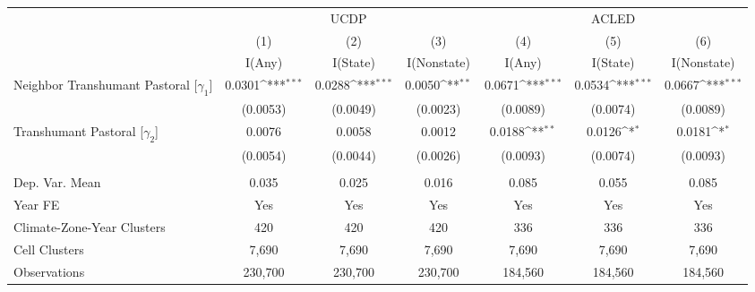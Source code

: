 {
\def\sym#1{\ifmmode^{#1}\else\(^{#1}\)\fi}
\begin{tabular}{l*{6}{c}}
\toprule
                    &\multicolumn{3}{c}{UCDP}                                         &\multicolumn{3}{c}{ACLED}                                        \\\cmidrule(lr){2-4}\cmidrule(lr){5-7}
                    &\multicolumn{1}{c}{(1)}&\multicolumn{1}{c}{(2)}&\multicolumn{1}{c}{(3)}&\multicolumn{1}{c}{(4)}&\multicolumn{1}{c}{(5)}&\multicolumn{1}{c}{(6)}\\
                    &\multicolumn{1}{c}{I(Any)}&\multicolumn{1}{c}{I(State)}&\multicolumn{1}{c}{I(Nonstate)}&\multicolumn{1}{c}{I(Any)}&\multicolumn{1}{c}{I(State)}&\multicolumn{1}{c}{I(Nonstate)}\\
\midrule
Neighbor Transhumant Pastoral [$\gamma_{1}$]&      0.0301\sym{***}&      0.0288\sym{***}&      0.0050\sym{**} &      0.0671\sym{***}&      0.0534\sym{***}&      0.0667\sym{***}\\
                    &    (0.0053)         &    (0.0049)         &    (0.0023)         &    (0.0089)         &    (0.0074)         &    (0.0089)         \\
\addlinespace
Transhumant Pastoral [$\gamma_{2}$]&      0.0076         &      0.0058         &      0.0012         &      0.0188\sym{**} &      0.0126\sym{*}  &      0.0181\sym{*}  \\
                    &    (0.0054)         &    (0.0044)         &    (0.0026)         &    (0.0093)         &    (0.0074)         &    (0.0093)         \\
\midrule
\\ Dep. Var. Mean   &       0.035         &       0.025         &       0.016         &       0.085         &       0.055         &       0.085         \\
Year FE             &         Yes         &         Yes         &         Yes         &         Yes         &         Yes         &         Yes         \\
Climate-Zone-Year Clusters&         420         &         420         &         420         &         336         &         336         &         336         \\
Cell Clusters       &       7,690         &       7,690         &       7,690         &       7,690         &       7,690         &       7,690         \\
Observations        &     230,700         &     230,700         &     230,700         &     184,560         &     184,560         &     184,560         \\
\bottomrule
\end{tabular}
}
